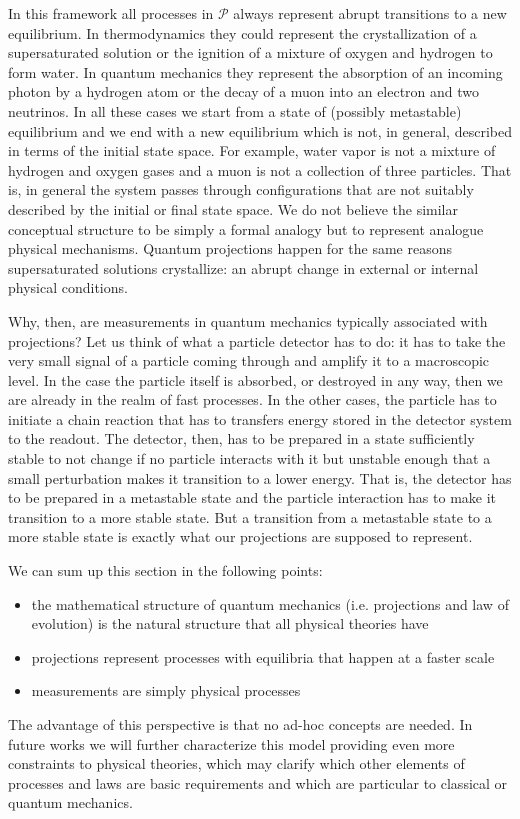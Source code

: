 \documentclass[11pt]{article}
\begin{document}
In this framework all processes in $\mathcal{P}$ always represent abrupt transitions to a new equilibrium. In thermodynamics they could represent the crystallization of a supersaturated solution or the ignition of a mixture of oxygen and hydrogen to form water. In quantum mechanics they represent the absorption of an incoming photon by a hydrogen atom or the decay of a muon into an electron and two neutrinos. In all these cases we start from a state of (possibly metastable) equilibrium and we end with a new equilibrium which is not, in general, described in terms of the initial state space. For example, water vapor is not a mixture of hydrogen and oxygen gases and a muon is not a collection of three particles. That is, in general the system passes through configurations that are not suitably described by the initial or final state space. We do not believe the similar conceptual structure to be simply a formal analogy but to represent analogue physical mechanisms. Quantum projections happen for the same reasons supersaturated solutions crystallize: an abrupt change in external or internal physical conditions.

Why, then, are measurements in quantum mechanics typically associated with projections? Let us think of what a particle detector has to do: it has to take the very small signal of a particle coming through and amplify it to a macroscopic level. In the case the particle itself is absorbed, or destroyed in any way, then we are already in the realm of fast processes. In the other cases, the particle has to initiate a chain reaction that has to transfers energy stored in the detector system to the readout. The detector, then, has to be prepared in a state sufficiently stable to not change if no particle interacts with it but unstable enough that a small perturbation makes it transition to a lower energy. That is, the detector has to be prepared in a metastable state and the particle interaction has to make it transition to a more stable state. But a transition from a metastable state to a more stable state is exactly what our projections are supposed to represent. %

We can sum up this section in the following points:
\begin{itemize}
	\item the mathematical structure of quantum mechanics (i.e. projections and law of evolution) is the natural structure that all physical theories have
	\item projections represent processes with equilibria that happen at a faster scale 
	\item measurements are simply physical processes
\end{itemize}
The advantage of this perspective is that no ad-hoc concepts are needed. In future works we will further characterize this model providing even more constraints to physical theories, which may clarify which other elements of processes and laws are basic requirements and which are particular to classical or quantum mechanics.
\end{document}
